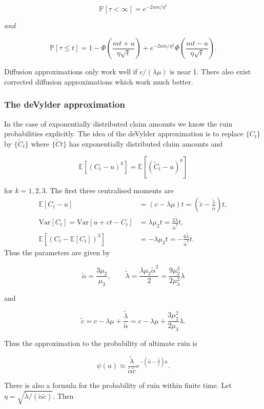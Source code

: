 \documentclass[a4paper,10pt,openany]{book}
\begin{document}
\[
\mathbb P[\tau<\infty]=e^{-2um/\eta^2}
\]

\emph{and}

\[
\mathbb P[\tau\le t]=1-\Phi\left(\frac{mt+u}{\eta\sqrt t}\right)+e^{-2um/\eta^2}\Phi\left(\frac{mt-u}{\eta\sqrt t}\right).
\]

Diffusion approximations only work well if \(c/(\lambda \mu)\) is near 1. There also exist corrected diffusion approximations which work much better.

\hypertarget{the-devylder-approximation}{%
\subsubsection{The deVylder approximation}\label{the-devylder-approximation}}

In the case of exponentially distributed claim amounts we know the ruin probabilities explicitly. The idea of the deVylder approximation is to replace \(\{C_t\}\) by \(\{\tilde C_t\}\) where \(\{\tilde Ct\}\) has exponentially distributed claim amounts and

\[
\mathbb E [(C_t-u)^k]=\mathbb E [(\tilde C_t-u)^k]
\]

for \(k=1,2,3\). The first three centralised moments are
\begin{align*}
\mathbb E [C_t-u]&=(c-\lambda\mu)t=\left(\tilde c -\frac{\tilde \lambda}{\tilde \alpha}\right)t,\\
\text{Var}[C_t]=\text{Var}[u+ct-C_t]&=\lambda\mu_2t=\frac{2\tilde \lambda}{\tilde \alpha^2}t,\\
\mathbb E [(C_t-\mathbb E[C_t])^3]&=-\lambda\mu_3t=-\frac{6\tilde \lambda}{\tilde\alpha ^3}t.
\end{align*}
Thus the parameters are given by

\[
\tilde\alpha =\frac{3\mu_2}{\mu_3},\qquad\tilde\lambda=\frac{\lambda\mu_2\tilde \alpha^2}{2}=\frac{9\mu_2^3}{2\mu_3^2}\lambda
\]

and

\[
\tilde c=c-\lambda\mu+\frac{\tilde \lambda}{\tilde\alpha}=c-\lambda\mu+\frac{3\mu_2^2}{2\mu_3}\lambda.
\]

Thus the approximation to the probability of ultimate ruin is

\[
\psi(u)\approx \frac{\tilde \lambda}{\tilde\alpha\tilde c}e^{-\left(\tilde\alpha-\frac{\tilde \lambda}{\tilde c}\right)u}.
\]

There is also a formula for the probability of ruin within finite time. Let \(\eta =\sqrt{\tilde \lambda/(\tilde \alpha\tilde c)}\). Then
\end{document}
